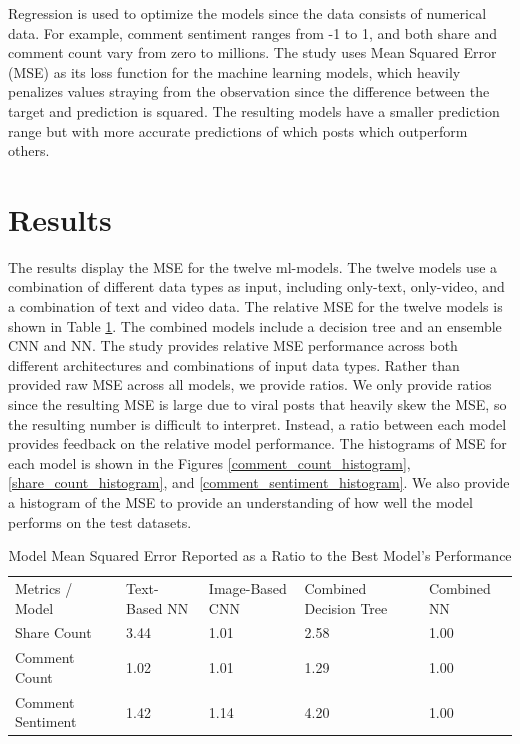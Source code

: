 \documentclass[mksc,blindrev]{informs3} %
\begin{document}
Regression is used to optimize the models since the data consists of numerical data. For example, comment sentiment ranges from -1 to 1, and both share and comment count vary from zero to millions. The study uses Mean Squared Error (MSE) as its loss function for the machine learning models, which heavily penalizes values straying from the observation since the difference between the target and prediction is squared. The resulting models have a smaller prediction range but with more accurate predictions of which posts which outperform others.

\section{Results}

The results display the MSE for the twelve ml-models. The twelve models use a combination of different data types as input, including only-text, only-video, and a combination of text and video data. The relative MSE for the twelve models is shown in Table \ref{mse_ratios}. The combined models include a decision tree and an ensemble CNN and NN. The study provides relative MSE performance across both different architectures and combinations of input data types. Rather than provided raw MSE across all models, we provide ratios. We only provide ratios since the resulting MSE is large due to viral posts that heavily skew the MSE, so the resulting number is difficult to interpret. Instead, a ratio between each model provides feedback on the relative model performance. The histograms of MSE for each model is shown in the Figures \ref{comment_count_histogram}, \ref{share_count_histogram}, and \ref{comment_sentiment_histogram}. We also provide a histogram of the MSE to provide an understanding of how well the model performs on the test datasets.

\begin{table}[]
\centering
\begin{tabular}{lllll}
Metrics / Model & Text-Based NN & Image-Based CNN & Combined Decision Tree & Combined NN \\
Share Count       & 3.44 & 1.01 & 2.58 & 1.00 \\
Comment Count     & 1.02 & 1.01 & 1.29 & 1.00 \\
Comment Sentiment & 1.42 & 1.14 & 4.20 & 1.00
\end{tabular}
\caption{\label{mse_ratios}Model Mean Squared Error Reported as a Ratio to the Best Model's Performance}
\end{table}
\end{document}
